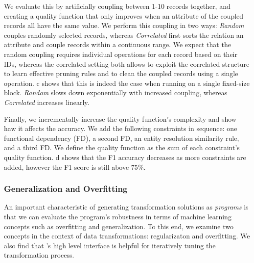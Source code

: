 We evaluate this by artificially coupling between 1-10 records together, and creating a quality function that only improves when an attribute of the coupled records all have the same value.  We perform this coupling in two ways: {\it Random} couples randomly selected records, whereas {\it Correlated} first sorts the relation an attribute and couple records within a continuous range.  We expect that the random coupling requires individual operations for each record based on their IDs, whereas the correlated setting both allows \sys to exploit the correlated structure to learn effective pruning rules and to clean the coupled records using a single operation.  c shows that this is indeed the case when running \sys on a single fixed-size block. {\it Random} slows down exponentially with increased coupling, whereas {\it Correlated} increases linearly.


 Finally, we incrementally increase the quality function's complexity and show haw it affects the accuracy.  We add the following constraints in sequence: one functional dependency (FD), a second FD, an entity resolution similarity rule, and a third FD.  We define the quality function as the sum of each constraint's quality function.   d shows that the F1 accuracy decreases as more constraints are added, however the F1 score is still above $75\%$.  


\subsubsection{Generalization and Overfitting}\label{s:expoverfit}
An important characteristic of generating transformation solutions as {\it programs} is that we can evaluate the program's robustness in terms of machine learning concepts such as overfitting and generalization.    To this end, we examine two concepts in the context of data transformations: regularizaton and overfitting.  We also find that \sys's high level interface is helpful for iteratively tuning the transformation process.

